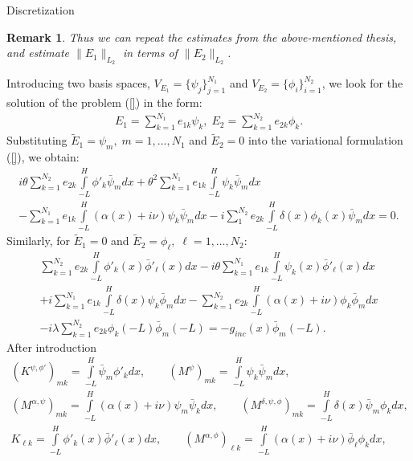 \documentclass[11pt]{amsart}
\newtheorem{remark}{Remark}
\begin{document}
\begin{subsection}{Discretization}
\begin{remark}
Thus we can repeat the estimates from the above-mentioned thesis, and estimate $\|E_{1}\|_{L_{2}}$ in terms of $\|E_{2}\|_{L_{2}}$.
\end{remark}



Introducing two basis spaces, $V_{E_{1}}=\{\psi_{j}\}_{j=1}^{N_{1}}$ and $V_{E_{2}}=\{\phi_{i}\}_{i=1}^{N_{2}}$, we look for the solution of the problem (\ref{}) in the form:
\begin{align*}
E_{1}=\sum\limits_{k=1}^{N_{1}}e_{1k}\psi_{k},\; E_{2}=\sum\limits_{k=1}^{N_{2}}e_{2k}\phi_{k}.
\end{align*}
Substituting $\tilde{E}_{1}=\psi_{m}, \; m=1,\ldots,N_{1}$ and $\tilde{E}_{2}=0$ into the variational formulation (\ref{}), we obtain:
\begin{align*}
i\theta\sum\limits_{k=1}^{N_{2}}e_{2k}\int\limits_{-L}^{H}\phi'_{k}\bar{\psi}_{m}dx+\theta^2\sum\limits_{k=1}^{N_{1}}e_{1k}\int\limits_{-L}^{H}\psi_{k}\bar{\psi}_{m}dx\\
-\sum\limits_{k=1}^{N_{1}}e_{1k}\int\limits_{-L}^{H}(\alpha(x)+i\nu)\psi_{k}\bar{\psi}_{m}dx-i\sum\limits_{1}^{N_{2}}e_{2k}\int\limits_{-L}^{H}\delta(x)\phi_{k}(x)\bar{\psi}_{m}dx=0.
\end{align*}
Similarly, for $\tilde{E}_{1}=0$ and $\tilde{E}_{2}=\phi_{\ell},\; \ell=1,\ldots, N_{2}$:
\begin{align*}
\sum\limits_{k=1}^{N_{2}}e_{2k}\int\limits_{-L}^{H}\phi'_{k}(x)\bar{\phi}'_{\ell}(x)dx-i\theta\sum\limits_{k=1}^{N_{1}}e_{1k}\int\limits_{-L}^{H}\psi_{k}(x)\bar{\phi}'_{\ell}(x)dx\\
+i
\sum\limits_{k=1}^{N_{1}}e_{1k}\int\limits_{-L}^{H}\delta(x)\psi_{k}\bar{\phi}_{m}dx-\sum\limits_{k=1}^{N_{2}}e_{2k}\int\limits_{-L}^{H}(\alpha(x)+i\nu)\phi_{k}\bar{\phi}_{m}dx\\
-
i\lambda\sum\limits_{k=1}^{N_{2}}e_{2k}\phi_{k}(-L)\bar{\phi}_{m}(-L)=-g_{inc}(x)\bar{\phi}_{m}(-L).
\end{align*}
After introduction 
\begin{align*}
\left(K^{\psi,\phi'}\right)_{mk}=\int\limits_{-L}^{H}\bar{\psi}_{m}\phi'_{k}dx,\qquad \left(M^{\psi}\right)_{mk}=\int\limits_{-L}^{H}\psi_{k}\bar{\psi}_{m}dx,\\
\left(M^{\alpha,\psi}\right)_{mk}=\int\limits_{-L}^{H}(\alpha(x)+i\nu)\psi_{m}\bar{\psi}_{k}dx, \qquad \left(M^{\delta,\psi,\phi}\right)_{mk}=\int\limits_{-L}^{H}\delta(x)\bar{\psi}_{m}\phi_{k}dx,\\
K_{\ell k}=\int\limits_{-L}^{H}\phi'_{k}(x)\bar{\phi}'_{\ell}(x)dx,\qquad \left(M^{\alpha,\phi}\right)_{\ell k}=\int\limits_{-L}^{H}(\alpha(x)+i\nu)\bar{\phi}_{\ell}\phi_{k}dx,\\

\end{align*}
\end{subsection}
\end{document}
